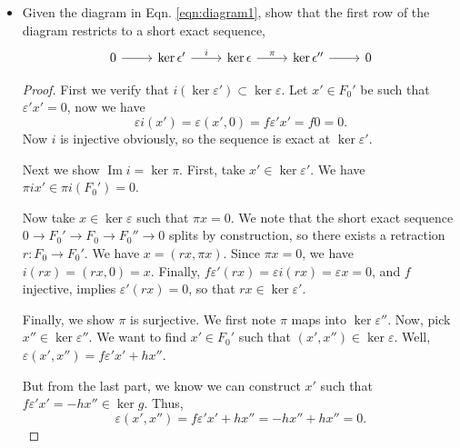 \begin{enumerate}
\begin{itemize}
\begin{proof}
	 Now consider general  $n \in N$. Let $n'' = g n$.  By surjectivity of $\varepsilon''$, there exists $x'' \in F_0''$ such that $\varepsilon'' x'' = g n$. That is, $g n = g h x''$. Then $n = h x'' + \left( - h x'' + n \right) $, where $(- h x'' + n) \in \operatorname{ker} g$. Let $x_0'$ be such that $\varepsilon(x', 0) = - h x'' + n$. We now have
	 \[
	 	n = \varepsilon(0, x'') + \varepsilon(x', 0) = \varepsilon(x', x'')
	 .\] 
	 Thus $\varepsilon$ is surjective.
 \end{proof}


\item Given the diagram in Eqn. \ref{eqn:diagram1}, show that the first row of the diagram restricts to a short exact sequence,
\begin{equation*}
        \begin{tikzcd}
            0 \arrow[r] & \ker \epsilon' \arrow[r, "i"] &  \ker \epsilon \arrow[r, "\pi"] & \ker \epsilon'' \arrow[r] & 0
        \end{tikzcd}
\end{equation*}
\begin{proof}
	First we verify that $i(\operatorname{ker} \varepsilon') \subset \operatorname{ker} \varepsilon$. Let $x' \in F_0'$ be such that $\varepsilon' x' = 0$, now we have
	\[
		\varepsilon i(x') = \varepsilon(x', 0) = f \varepsilon' x' = f 0 = 0
	.\] 
	Now $i$ is injective obviously, so the sequence is exact at $\operatorname{ker} \varepsilon'$.

	Next we show $\operatorname{Im} i = \operatorname{ker} \pi$. First, take $x' \in \operatorname{ker} \varepsilon'$. We have $\pi i x' \in \pi i(F_0') = 0$.

	Now take $x \in \operatorname{ker} \varepsilon$ such that $\pi x = 0$. We note that the short exact sequence $0 \to F_0' \to F_0 \to F_0'' \to  0$ splits by construction, so there exists a retraction $r: F_0 \to  F_0'$. We have $x = (rx, \pi x)$. Since $\pi x = 0$, we have $i(r x) = (rx, 0) = x$. Finally, $f \varepsilon' (rx) = \varepsilon i (r x) = \varepsilon x = 0$, and $f$ injective, implies $\varepsilon' (rx) = 0$, so that $r x \in \operatorname{ker} \varepsilon'$.

	Finally, we show $\pi$ is surjective. We first note $\pi$ maps into $\operatorname{ker} \varepsilon''$. Now, pick $x'' \in \operatorname{ker} \varepsilon''$. We want to find  $x' \in F_0'$ such that $(x', x'') \in \operatorname{ker} \varepsilon$. Well,  $\varepsilon(x', x'') = f \varepsilon' x' + h x''$. 

	But from the last part, we know we can construct $x'$ such that $f \varepsilon' x' = - h x'' \in \operatorname{ker} g$. Thus,
	\[
		\varepsilon(x', x'') = f \varepsilon' x' + h x'' = - h x'' + h x'' = 0
	.\] 
\end{proof}


\end{itemize}
\end{enumerate}
